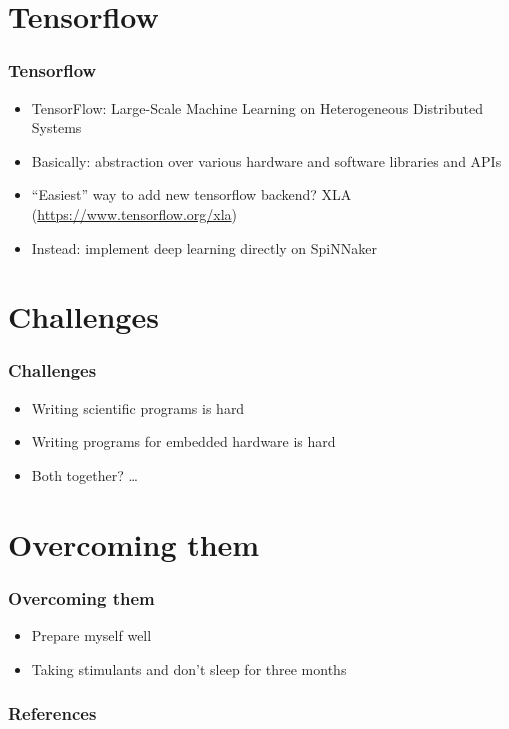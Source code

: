 \documentclass[xcolor=x11names,compress,usenames,dvipsnames,mathsans]{beamer}
\begin{document}
\section{Tensorflow}

\begin{frame}[fragile]
  \frametitle{Tensorflow}

  \begin{itemize}[<+->]
    \item TensorFlow: Large-Scale Machine Learning on
          Heterogeneous Distributed Systems \cite{tf_2015}
    \item Basically: abstraction over various hardware and
          software libraries and APIs
    \item ``Easiest'' way to add new tensorflow backend? XLA
          (\url{https://www.tensorflow.org/xla})
    \item Instead: implement deep learning directly on
      SpiNNaker
  \end{itemize}
\end{frame}

\section{Challenges}

\begin{frame}[fragile]
  \frametitle{Challenges}

  \begin{itemize}[<+->]
    \item Writing scientific programs is hard
    \item Writing programs for embedded hardware is hard
    \item Both together? \dots
  \end{itemize}
\end{frame}

\section{Overcoming them}

\begin{frame}[fragile]
  \frametitle{Overcoming them}

  \begin{itemize}[<+->]
    \item Prepare myself well
    \item Taking stimulants and don't sleep for three
          months
  \end{itemize}
\end{frame}

\begin{frame}
  \frametitle{References}
  
\end{frame}
\end{document}
